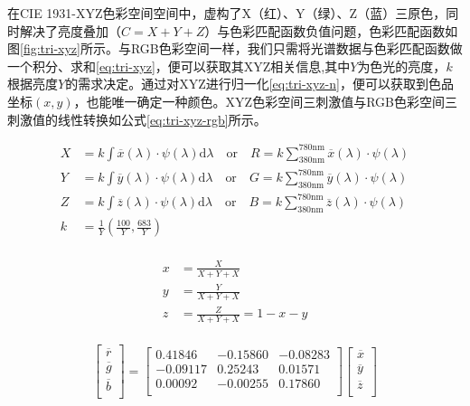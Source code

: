 在CIE 1931-XYZ色彩空间空间中，虚构了X（红）、Y（绿）、Z（蓝）三原色，同时解决了亮度叠加（$C=X+Y+Z$）与色彩匹配函数负值问题，色彩匹配函数如图\ref{fig:tri-xyz}所示。与RGB色彩空间一样，我们只需将光谱数据与色彩匹配函数做一个积分、求和\eqref{eq:tri-xyz}，便可以获取其XYZ相关信息,其中$Y$为色光的亮度，$k$根据亮度$Y$的需求决定。通过对XYZ进行归一化\eqref{eq:tri-xyz-n}，便可以获取到色品坐标$(x,y)$，也能唯一确定一种颜色。XYZ色彩空间三刺激值与RGB色彩空间三刺激值的线性转换如公式\eqref{eq:tri-xyz-rgb}所示。

\begin{equation}
    \begin{aligned}
        X & =k\int \overline{x}(\lambda)\cdot\psi(\lambda)\text{d}\lambda \quad\text{or}\quad R = k\sum_{380\text{nm}}^{780\text{nm}} \overline{x}(\lambda)\cdot\psi(\lambda)\\
        Y & =k\int \overline{y}(\lambda)\cdot\psi(\lambda)\text{d}\lambda \quad\text{or}\quad G = k\sum_{380\text{nm}}^{780\text{nm}} \overline{y}(\lambda)\cdot\psi(\lambda)\\
        Z & =k\int \overline{z}(\lambda)\cdot\psi(\lambda)\text{d}\lambda \quad\text{or}\quad B = k\sum_{380\text{nm}}^{780\text{nm}} \overline{z}(\lambda)\cdot\psi(\lambda)\\
        k & = \frac{1}{Y} (\frac{100}{Y},\frac{683}{Y})\\
    \end{aligned}
    \label{eq:tri-xyz}
\end{equation}

\begin{equation}
    \begin{aligned}
        x & =\frac{X}{X+Y+X}\\
        y & =\frac{Y}{X+Y+X}\\
        z & =\frac{Z}{X+Y+X} = 1-x-y\\
    \end{aligned}
    \label{eq:tri-xyz-n}
\end{equation}

\begin{equation}
    \begin{bmatrix}
        \overline{r}\\
        \overline{g}\\
        \overline{b}\\
    \end{bmatrix} = \begin{bmatrix}
    0.41846 & -0.15860 & -0.08283\\
    -0.09117 & 0.25243 & 0.01571\\
    0.00092 & -0.00255 & 0.17860\\
    \end{bmatrix}\begin{bmatrix}
        \overline{x}\\
        \overline{y}\\
        \overline{z}\\
    \end{bmatrix}
    \label{eq:tri-xyz-rgb}
\end{equation}


